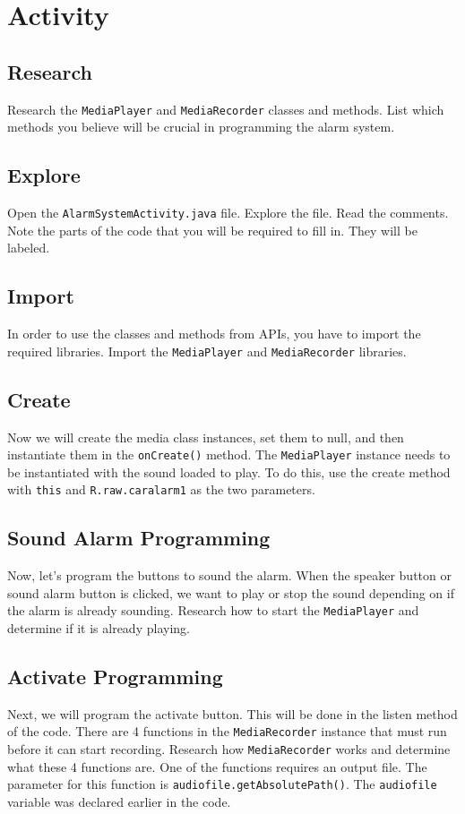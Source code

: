 \section{Activity}

\subsection{Research}
Research the \verb=MediaPlayer= and \verb=MediaRecorder= classes and methods. List which methods you believe will be crucial in programming the alarm system.

\subsection{Explore}
Open the \verb=AlarmSystemActivity.java= file. Explore the file. Read the comments. Note the parts of the code that you will be required to fill in. They will be labeled.

\subsection{Import}
In order to use the classes and methods from APIs, you have to import the required libraries. Import the \verb=MediaPlayer= and \verb=MediaRecorder= libraries.

\subsection{Create}
Now we will create the media class instances, set them to null, and then instantiate them in the \verb=onCreate()= method. The \verb=MediaPlayer= instance needs to be instantiated with the sound loaded to play. To do this, use the create method with \verb=this= and \verb=R.raw.caralarm1= as the two parameters.

\subsection{Sound Alarm Programming}
Now, let's program the buttons to sound the alarm. When the speaker button or sound alarm button is clicked, we want to play or stop the sound depending on if the alarm is already sounding. Research how to start the \verb=MediaPlayer= and determine if it is already playing.

\subsection{Activate Programming}
Next, we will program the activate button. This will be done in the listen method of the code. There are 4 functions in the \verb=MediaRecorder= instance that must run before it can start recording. Research how \verb=MediaRecorder= works and determine what these 4 functions are. One of the functions requires an output file. The parameter for this function is \verb=audiofile.getAbsolutePath()=. The \verb=audiofile= variable was declared earlier in the code. 

